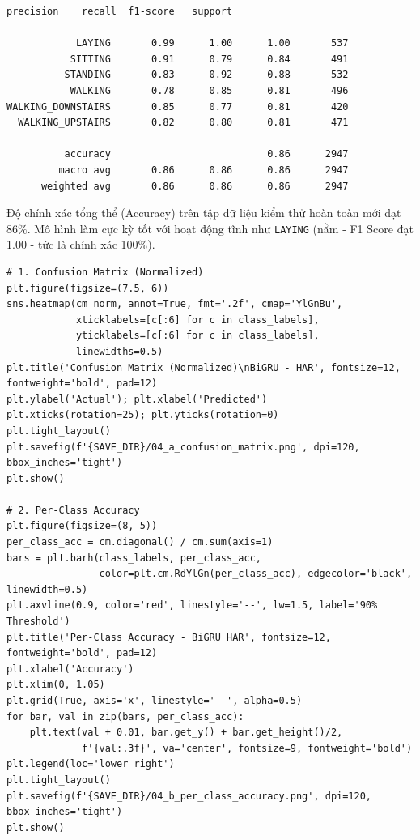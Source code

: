\begin{lstlisting}[style=consoleoutput, caption={Output: Báo cáo phân loại Classification Report}]
                    precision    recall  f1-score   support

            LAYING       0.99      1.00      1.00       537
           SITTING       0.91      0.79      0.84       491
          STANDING       0.83      0.92      0.88       532
           WALKING       0.78      0.85      0.81       496
WALKING_DOWNSTAIRS       0.85      0.77      0.81       420
  WALKING_UPSTAIRS       0.82      0.80      0.81       471

          accuracy                           0.86      2947
         macro avg       0.86      0.86      0.86      2947
      weighted avg       0.86      0.86      0.86      2947
\end{lstlisting}

Độ chính xác tổng thể (Accuracy) trên tập dữ liệu kiểm thử hoàn toàn mới đạt $86\%$. Mô hình làm cực kỳ tốt với hoạt động tĩnh như \texttt{LAYING} (nằm - F1 Score đạt 1.00 - tức là chính xác 100\%).

\begin{lstlisting}[style=pythoncode, caption={Trực quan hóa Ma trận Nhầm lẫn và Per-class Accuracy}]
# 1. Confusion Matrix (Normalized)
plt.figure(figsize=(7.5, 6))
sns.heatmap(cm_norm, annot=True, fmt='.2f', cmap='YlGnBu',
            xticklabels=[c[:6] for c in class_labels],
            yticklabels=[c[:6] for c in class_labels],
            linewidths=0.5)
plt.title('Confusion Matrix (Normalized)\nBiGRU - HAR', fontsize=12, fontweight='bold', pad=12)
plt.ylabel('Actual'); plt.xlabel('Predicted')
plt.xticks(rotation=25); plt.yticks(rotation=0)
plt.tight_layout()
plt.savefig(f'{SAVE_DIR}/04_a_confusion_matrix.png', dpi=120, bbox_inches='tight')
plt.show()

# 2. Per-Class Accuracy
plt.figure(figsize=(8, 5))
per_class_acc = cm.diagonal() / cm.sum(axis=1)
bars = plt.barh(class_labels, per_class_acc,
                color=plt.cm.RdYlGn(per_class_acc), edgecolor='black', linewidth=0.5)
plt.axvline(0.9, color='red', linestyle='--', lw=1.5, label='90% Threshold')
plt.title('Per-Class Accuracy - BiGRU HAR', fontsize=12, fontweight='bold', pad=12)
plt.xlabel('Accuracy')
plt.xlim(0, 1.05)
plt.grid(True, axis='x', linestyle='--', alpha=0.5)
for bar, val in zip(bars, per_class_acc):
    plt.text(val + 0.01, bar.get_y() + bar.get_height()/2,
             f'{val:.3f}', va='center', fontsize=9, fontweight='bold')
plt.legend(loc='lower right')
plt.tight_layout()
plt.savefig(f'{SAVE_DIR}/04_b_per_class_accuracy.png', dpi=120, bbox_inches='tight')
plt.show()
\end{lstlisting}

